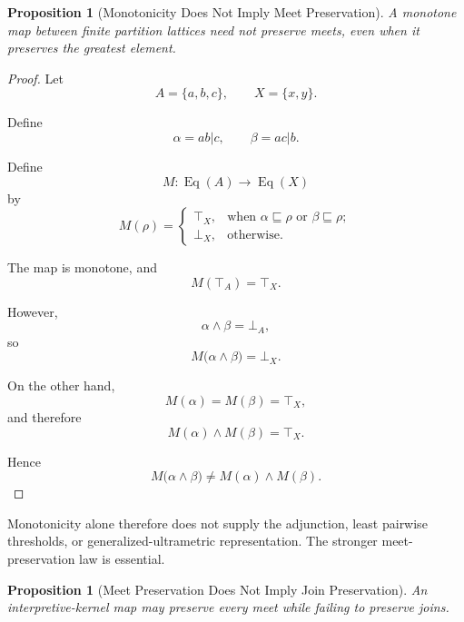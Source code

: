 \documentclass[11pt]{article}
\theoremstyle{plain}
\newtheorem{proposition}[theorem]{Proposition}
\theoremstyle{definition}
\theoremstyle{remark}
\begin{document}
\begin{proposition}[Monotonicity Does Not Imply Meet Preservation]
  \label{ik.prop.monotone-not-meet}
  A monotone map between finite partition lattices
  need not preserve meets,
  even when it preserves the greatest element.
\end{proposition}

\begin{proof}
  Let
  \[
    A
    =
    \{a,b,c\},
    \qquad
    X
    =
    \{x,y\}.
  \]

  Define
  \[
    \alpha
    =
    ab|c,
    \qquad
    \beta
    =
    ac|b.
  \]

  Define
  \[
    M:
    \operatorname{Eq}(A)
    \longrightarrow
    \operatorname{Eq}(X)
  \]
  by
  \[
    M(\rho)
    =
    \begin{cases}
      \top_X,
       &
      \text{when }
      \alpha\sqsubseteq\rho
      \text{ or }
      \beta\sqsubseteq\rho;
      \\
      \bot_X,
       &
      \text{otherwise.}
    \end{cases}
  \]

  The map is monotone,
  and
  \[
    M(\top_A)
    =
    \top_X.
  \]

  However,
  \[
    \alpha\wedge\beta
    =
    \bot_A,
  \]
  so
  \[
    M
    \bigl(
    \alpha\wedge\beta
    \bigr)
    =
    \bot_X.
  \]

  On the other hand,
  \[
    M(\alpha)
    =
    M(\beta)
    =
    \top_X,
  \]
  and therefore
  \[
    M(\alpha)
    \wedge
    M(\beta)
    =
    \top_X.
  \]

  Hence
  \[
    M
    \bigl(
    \alpha\wedge\beta
    \bigr)
    \neq
    M(\alpha)
    \wedge
    M(\beta).
  \]
\end{proof}

Monotonicity alone therefore does not supply
the adjunction,
least pairwise thresholds,
or generalized-ultrametric representation.
The stronger meet-preservation law is essential.

\begin{proposition}[Meet Preservation Does Not Imply Join Preservation]
  \label{ik.prop.meet-not-join}
  An interpretive-kernel map
  may preserve every meet
  while failing to preserve joins.
\end{proposition}
\end{document}
